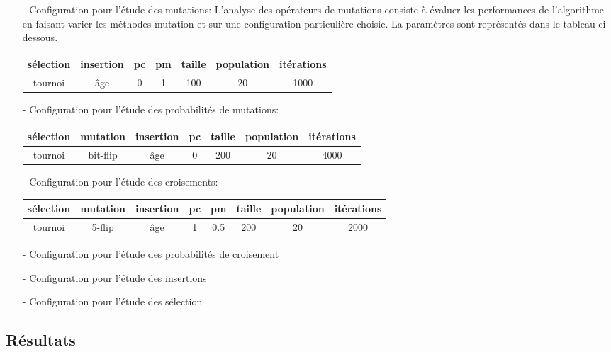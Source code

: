 \documentclass{article}
\begin{document}
\begin{itemize}
    \item[-] Configuration pour l'étude des mutations: L'analyse des opérateurs de mutations consiste à évaluer les performances de l'algorithme en faisant varier les méthodes mutation et sur une configuration particulière choisie. La paramètres sont représentés dans le tableau ci dessous.
    
    \begin{tabular}{|c|c|c|c|c|c|c|}
    \hline
    sélection & insertion & pc & pm & taille & population & itérations \\
    \hline
    tournoi & âge & 0 & 1 & 100 & 20 & 1000\\
    \hline
    \end{tabular}
    
    \item[-] Configuration pour l'étude des probabilités de mutations:
    
    \begin{tabular}{|c|c|c|c|c|c|c|}
    \hline
    sélection & mutation & insertion & pc & taille & population & itérations \\
    \hline
    tournoi & bit-flip & âge & 0 & 200 & 20 & 4000\\
    \hline
    \end{tabular}
    
    
    \item[-] Configuration pour l'étude des croisements:
    
    \begin{tabular}{|c|c|c|c|c|c|c|c|}
     \hline
    sélection & mutation & insertion & pc & pm & taille & population & itérations \\
    \hline
    tournoi & 5-flip & âge & 1 & 0.5 & 200 & 20 & 2000\\
    \hline
    \end{tabular}
    
    \item[-] Configuration pour l'étude des probabilités de croisement
    
    
    \item[-] Configuration pour l'étude des insertions
    
    \item[-] Configuration pour l'étude des sélection
        
\end{itemize}

\subsection{Résultats}
\end{document}
